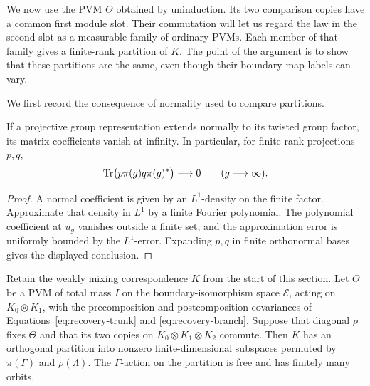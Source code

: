 We now use the PVM $\Theta$ obtained by uninduction.  Its two comparison
copies have a common first module slot.  Their commutation will let us
regard the law in the second slot as a measurable family of ordinary
PVMs.  Each member of that family gives a finite-rank partition of $K$.
The point of the argument is to show that these partitions are the same,
even though their boundary-map labels can vary.

We first record the consequence of normality used to compare partitions.

\begin{lemma}
\label{lem:recovery-coefficients}
If a projective group representation extends normally to its twisted
group factor, its matrix coefficients vanish at infinity.  In particular,
for finite-rank projections $p,q$,
\[
 \operatorname{Tr}\bigl(p\pi(g)q\pi(g)^*\bigr)\longrightarrow0
 \qquad(g\longrightarrow\infty).
\]
\end{lemma}

\begin{proof}
A normal coefficient is given by an $L^1$-density on the finite factor.
Approximate that density in $L^1$ by a finite Fourier polynomial.  The
polynomial coefficient at $u_g$ vanishes outside a finite set, and the
approximation error is uniformly bounded by the $L^1$-error.  Expanding
$p,q$ in finite orthonormal bases gives the displayed conclusion.
\end{proof}

\begin{proposition}
\label{prop:recovery-partition}
Retain the weakly mixing correspondence $K$ from the start of this section.
Let $\Theta$ be a PVM of total mass $I$ on the boundary-isomorphism space
$\mathscr E$, acting on $K_0\otimes K_1$, with the precomposition and postcomposition
covariances of Equations~\eqref{eq:recovery-trunk} and
\eqref{eq:recovery-branch}.  Suppose that diagonal $\rho$ fixes $\Theta$
and that its two copies on $K_0\otimes K_1\otimes K_2$ commute.
Then $K$ has an orthogonal partition into nonzero finite-dimensional
subspaces permuted by $\pi(\Gamma)$ and $\rho(\Lambda)$.  The
$\Gamma$-action on the partition is free and has finitely many orbits.
\end{proposition}

